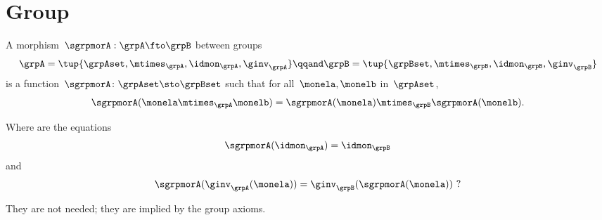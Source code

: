 \section{Group \whomos}



\begin{ctdefinition}
  \label{def:group-mor}
  A morphism~$\sgrpmorA: \grpA \fto \grpB$ between groups
  \begin{equation}
    \grpA = \tup{\grpAset, \mtimes_\grpA, \idmon_\grpA, \ginv_\grpA}
    \qqand
    \grpB = \tup{\grpBset, \mtimes_\grpB, \idmon_\grpB,  \ginv_\grpB}
  \end{equation}
  is a function~$\sgrpmorA \colon \grpAset \sto \grpBset$ such that
  for all~$\monela, \monelb$ in~$\grpAset$,
  \begin{equation}
    \label{eq:group-mor-comp}
    \sgrpmorA (\monela \mtimes_{\grpA} \monelb) = \sgrpmorA (\monela) \mtimes_{\grpB}  \sgrpmorA(\monelb).
  \end{equation}
\end{ctdefinition}

Where are the equations
\begin{equation}
  \label{eq:grp-id-comp}
  \sgrpmorA (\idmon_\grpA) = \idmon_{\grpB}
\end{equation}
and
\begin{equation}
  \label{eq:grp-inv-comp}
  \sgrpmorA (\ginv_\grpA(\monela)) = \ginv_\grpB(\sgrpmorA(\monela)) \ ?
\end{equation}

They are not needed; they are implied by the group axioms.

